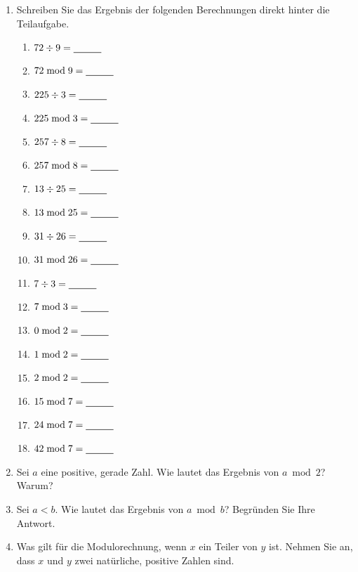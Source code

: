 \begin{enumerate}
	\item Schreiben Sie das Ergebnis der folgenden Berechnungen direkt hinter die Teilaufgabe.

\begin{multicols}{3}
\begin{enumerate}
\item $72 \div 9 = \rule[-0.75mm]{1cm}{.5pt}$
\item $72 \bmod 9 = \rule[-0.75mm]{1cm}{.5pt}$
\item $225 \div 3 = \rule[-0.75mm]{1cm}{.5pt}$
\item $225 \bmod 3 = \rule[-0.75mm]{1cm}{.5pt}$
\item $257 \div 8 = \rule[-0.75mm]{1cm}{.5pt}$
\item $257 \bmod 8 = \rule[-0.75mm]{1cm}{.5pt}$
\item $13 \div 25 = \rule[-0.75mm]{1cm}{.5pt}$
\item $13 \bmod 25 = \rule[-0.75mm]{1cm}{.5pt}$
\item $31 \div 26 = \rule[-0.75mm]{1cm}{.5pt}$
\item $31 \bmod 26 = \rule[-0.75mm]{1cm}{.5pt}$
\item $7 \div 3 = \rule[-0.75mm]{1cm}{.5pt}$
\item $7 \bmod 3 = \rule[-0.75mm]{1cm}{.5pt}$
\item $0 \bmod 2 = \rule[-0.75mm]{1cm}{.5pt}$
\item $1 \bmod 2 = \rule[-0.75mm]{1cm}{.5pt}$
\item $2 \bmod 2 = \rule[-0.75mm]{1cm}{.5pt}$
\item $15 \bmod 7 = \rule[-0.75mm]{1cm}{.5pt}$
\item $24 \bmod 7 = \rule[-0.75mm]{1cm}{.5pt}$
\item $42 \bmod 7 = \rule[-0.75mm]{1cm}{.5pt}$
\end{enumerate}
\end{multicols}

	\item Sei $a$ eine positive, gerade Zahl. Wie lautet das Ergebnis von $a \bmod 2$? Warum?
	
	\fillwithgrid	{1in}
	
	\item Sei $a < b$. Wie lautet das Ergebnis von $a \bmod b$? Begründen Sie Ihre Antwort.
	
	\fillwithgrid	{1in}
	
	\item Was gilt für die Modulorechnung, wenn $x$ ein Teiler von $y$ ist. Nehmen Sie an, dass $x$ und $y$ zwei natürliche, positive Zahlen sind.

	\fillwithgrid	{1in}

\end{enumerate}